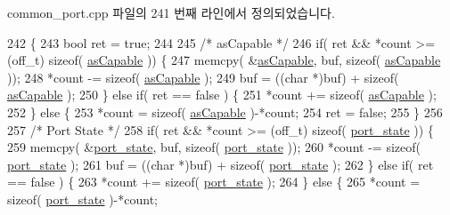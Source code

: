 common\+\_\+port.\+cpp 파일의 241 번째 라인에서 정의되었습니다.


\begin{DoxyCode}
242 \{
243     \textcolor{keywordtype}{bool} ret = \textcolor{keyword}{true};
244 
245     \textcolor{comment}{/* asCapable */}
246     \textcolor{keywordflow}{if}( ret && *count >= (off\_t) \textcolor{keyword}{sizeof}( \hyperlink{class_common_port_a15a09cf240fb37b905e4d4e1e9f5b9a1}{asCapable} )) \{
247         memcpy( &\hyperlink{class_common_port_a15a09cf240fb37b905e4d4e1e9f5b9a1}{asCapable}, buf, \textcolor{keyword}{sizeof}( \hyperlink{class_common_port_a15a09cf240fb37b905e4d4e1e9f5b9a1}{asCapable} ));
248         *count -= \textcolor{keyword}{sizeof}( \hyperlink{class_common_port_a15a09cf240fb37b905e4d4e1e9f5b9a1}{asCapable} );
249         buf = ((\textcolor{keywordtype}{char} *)buf) + \textcolor{keyword}{sizeof}( \hyperlink{class_common_port_a15a09cf240fb37b905e4d4e1e9f5b9a1}{asCapable} );
250     \} \textcolor{keywordflow}{else} \textcolor{keywordflow}{if}( ret == \textcolor{keyword}{false} ) \{
251         *count += \textcolor{keyword}{sizeof}( \hyperlink{class_common_port_a15a09cf240fb37b905e4d4e1e9f5b9a1}{asCapable} );
252     \} \textcolor{keywordflow}{else} \{
253         *count = \textcolor{keyword}{sizeof}( \hyperlink{class_common_port_a15a09cf240fb37b905e4d4e1e9f5b9a1}{asCapable} )-*count;
254         ret = \textcolor{keyword}{false};
255     \}
256 
257     \textcolor{comment}{/* Port State */}
258     \textcolor{keywordflow}{if}( ret && *count >= (off\_t) \textcolor{keyword}{sizeof}( \hyperlink{class_common_port_ae66554126902ed959a3b296ddd3204e8}{port\_state} )) \{
259         memcpy( &\hyperlink{class_common_port_ae66554126902ed959a3b296ddd3204e8}{port\_state}, buf, \textcolor{keyword}{sizeof}( \hyperlink{class_common_port_ae66554126902ed959a3b296ddd3204e8}{port\_state} ));
260         *count -= \textcolor{keyword}{sizeof}( \hyperlink{class_common_port_ae66554126902ed959a3b296ddd3204e8}{port\_state} );
261         buf = ((\textcolor{keywordtype}{char} *)buf) + \textcolor{keyword}{sizeof}( \hyperlink{class_common_port_ae66554126902ed959a3b296ddd3204e8}{port\_state} );
262     \} \textcolor{keywordflow}{else} \textcolor{keywordflow}{if}( ret == \textcolor{keyword}{false} ) \{
263         *count += \textcolor{keyword}{sizeof}( \hyperlink{class_common_port_ae66554126902ed959a3b296ddd3204e8}{port\_state} );
264     \} \textcolor{keywordflow}{else} \{
265         *count = \textcolor{keyword}{sizeof}( \hyperlink{class_common_port_ae66554126902ed959a3b296ddd3204e8}{port\_state} )-*count;

\end{DoxyCode}
